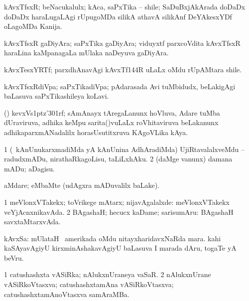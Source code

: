 \bentry
{}
\gl{\nA}
\bmng
kAvxTfsxR; beNacukalulx; kAca, saPxTika -- shile; SaDuBxjAkArada doDaDx doDaDx haraLugaLAgi rUpugoMDa silikA athavA silikAnf DeYAkesxYDf oLagoMDa Kanija. 
\emng
\eentry

\bentry
{}
\gl{\nA}
\bmng
kAvxTfsxR gaDiyAra; saPxTika gaDiyAra; viduyxtf parxcoVdita kAvxTfsxR haraLina kaMpanagaLa mUlaka naDeyuva gaDiyAra. 
\emng
\eentry

\bentry
{}
\gl{\nA}
\bmng
kAvxTesxYRTf; parxdhAnavAgi kAvxTf\char 144R uLaLx oMdu rUpAMtara shile. 
\emng
\eentry

\bentry
{}
\gl{\nA}
\bmng
kAvxTfsxRdiVpa; saPxTikadiVpa; pAdarasada Avi tuMbidudx, beLakigAgi baLasuva saPxTikashileya koLavi. 
\emng
\eentry

\bentry
{}
\gl{\nA}
\bmng
(\Kavi) kevxVs\kern 1ptz\char'301rf; sAmAnayx tAregaLanunx hoVluva, Adare tuMba dUraviruva, adhika keMpu sarita()vuLaLx roVhitaviruva beLakanunx adhikaparxmANadalilx horasUsutitxruva KAgoVLika kAya. 
\emng
\eentry

\bentry
{}
\gl{\sakirx}
\bmng
\bnum
\num{1} (\kanmu\ kAnUnukarxmadiMda yA kAnUnina AdhAradiMda) UjiRtavalalxveMdu -- radudxmADu, nirathaRkagoLisu, taLiLxhAku. 
\num{2} (daMge \mo vanunx) damana mADu; aDagisu. 
\enum
\emng
\eentry

\bentry
{}
\gl{\kirxvi}
\bmng
aMdare; eMbaMte (udAgxra mADuvalilx baLake). 
\emng
\eentry

\bentry
{}
\gl{\sapUpa}
\bmng
\bnum
\num{1} meVlonxVTakekx; toVrikege mAtarx; nijavAgalalxde:  meVlonxVTakekx veYjAcnxnikavAda. 
\num{2} BAgashaH; hecucx kaDame; sarisumAru:  BAgashaH savxtaMtarxvAda. 
\enum
\emng
\eentry

\bentry
{}
\gl{\nA}
\bmng
kAvxSa: 
\banum
{} mUlataH \da\ amerikada oMdu nitayxharidavxNaRda mara. 
 kahi kaSAyavAgiyU kirxminAshakavAgiyU baLasuva I marada dAru, togaTe yA beVru. 
\eanum
\emng
\eentry

\bentry
{}
\gl{\nA}
\bmng
\bnum
\num{1} catushashxta vASiRka; nAlukxnUraneya vaSaR. 
\num{2} nAlukxnUrane vASiRkoVtasxva; catushashxtamAna vASiRkoVtasxva; catushashxtamAnoVtasxva samAraMBa. 
\enum
\emng
\eentry

